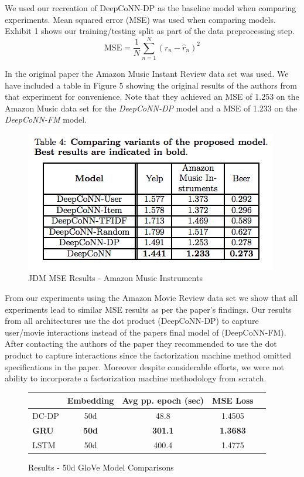\documentclass[10pt,twocolumn,letterpaper]{article}
\begin{document}
We used our recreation of DeepCoNN-DP as the baseline model when comparing experiments. Mean squared error (MSE) was used when comparing models. Exhibit 1 shows our training/testing split as part of the data preprocessing step.
$$
\mbox{MSE} = \frac{1}{N}\sum_{n=1}^{N}(r_{n} - \hat{r}_{n})^2
$$

In the original paper the Amazon Music Instant Review data set was used. We have included a table in Figure 5 showing the original results of the authors from that experiment for convenience. Note that they achieved an MSE of 1.253 on the Amazon Music data set for the \textit{DeepCoNN-DP} model and a MSE of 1.233 on the \textit{DeepCoNN-FM} model. 

\begin{figure}[!ht]
\begin{center}
\includegraphics[scale=0.50]{orig_mses.png}
\caption{JDM MSE Results - Amazon Music Instruments}
\end{center}
\end{figure}

From our experiments using the Amazon Movie Review data set we show that all experiments lead to similar MSE results as per the paper's findings. Our results from all architectures use the dot product  (DeepCoNN-DP)  to capture user/movie interactions instead of the papers final model of (DeepCoNN-FM). After contacting the authors of the paper they recommended to use the dot product to capture interactions since the factorization machine method omitted specifications in the paper. Moreover despite considerable efforts, we were not ability to incorporate a factorization machine methodology from scratch.   

\begin{figure}[!h]
\begin{center}
{\small
\begin{tabular}{l|cccc}
\hline
 & Embedding & Avg pp. epoch (sec) & MSE Loss \\
\hline
DC-DP & 50d & 48.8 & 1.4505   \\
\textbf{GRU}& \textbf{50d}& \textbf{301.1}& \textbf{1.3683} \\
LSTM & 50d & 400.4 & 1.4775  \\

\hline
\end{tabular}
}
\end{center}
\caption{Results - 50d GloVe Model Comparisons}
\end{figure}
\end{document}
